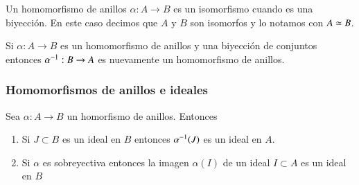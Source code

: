 \begin{dfn}
	Un homomorfismo de anillos $\alpha: A \to B$ es un isomorfismo cuando es una biyección. En este caso decimos que $A$ y $B$ son isomorfos y lo notamos con $A \simeq B$.
\end{dfn}

\begin{pro}
	Si $\alpha: A \to B$ es un homomorfismo de anillos y una biyección de conjuntos entonces $\alpha^{-1}:B \to A$ es nuevamente un homomorfismo de anillos.
\end{pro}

\subsubsection{Homomorfismos de anillos e ideales}

\begin{thm}
	Sea $\alpha: A \to B$ un homorfismo de anillos. Entonces
	\begin{enumerate}
		\item Si $J \subset B$ es un ideal en $B$ entonces $\alpha^{-1}(J)$ es un ideal en $A$.
		\item Si $\alpha$ es sobreyectiva entonces la imagen $\alpha(I)$ de un ideal $I \subset A$ es un ideal en $B$
	\end{enumerate}
\end{thm}

